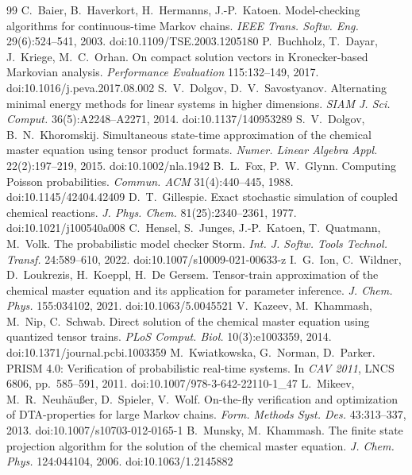 \documentclass[11pt]{article}
\begin{document}

\begin{thebibliography}{99}
 C.~Baier, B.~Haverkort, H.~Hermanns, J.-P.~Katoen. Model-checking algorithms for continuous-time Markov chains. \emph{IEEE Trans. Softw. Eng.} 29(6):524--541, 2003. doi:10.1109/TSE.2003.1205180
 P.~Buchholz, T.~Dayar, J.~Kriege, M.~C.~Orhan. On compact solution vectors in Kronecker-based Markovian analysis. \emph{Performance Evaluation} 115:132--149, 2017. doi:10.1016/j.peva.2017.08.002
 S.~V.~Dolgov, D.~V.~Savostyanov. Alternating minimal energy methods for linear systems in higher dimensions. \emph{SIAM J. Sci. Comput.} 36(5):A2248--A2271, 2014. doi:10.1137/140953289
 S.~V.~Dolgov, B.~N.~Khoromskij. Simultaneous state-time approximation of the chemical master equation using tensor product formats. \emph{Numer. Linear Algebra Appl.} 22(2):197--219, 2015. doi:10.1002/nla.1942
 B.~L.~Fox, P.~W.~Glynn. Computing Poisson probabilities. \emph{Commun. ACM} 31(4):440--445, 1988. doi:10.1145/42404.42409
 D.~T.~Gillespie. Exact stochastic simulation of coupled chemical reactions. \emph{J. Phys. Chem.} 81(25):2340--2361, 1977. doi:10.1021/j100540a008
 C.~Hensel, S.~Junges, J.-P.~Katoen, T.~Quatmann, M.~Volk. The probabilistic model checker Storm. \emph{Int. J. Softw. Tools Technol. Transf.} 24:589--610, 2022. doi:10.1007/s10009-021-00633-z
 I.~G.~Ion, C.~Wildner, D.~Loukrezis, H.~Koeppl, H.~De Gersem. Tensor-train approximation of the chemical master equation and its application for parameter inference. \emph{J. Chem. Phys.} 155:034102, 2021. doi:10.1063/5.0045521
 V.~Kazeev, M.~Khammash, M.~Nip, C.~Schwab. Direct solution of the chemical master equation using quantized tensor trains. \emph{PLoS Comput. Biol.} 10(3):e1003359, 2014. doi:10.1371/journal.pcbi.1003359
 M.~Kwiatkowska, G.~Norman, D.~Parker. PRISM 4.0: Verification of probabilistic real-time systems. In \emph{CAV 2011}, LNCS 6806, pp.~585--591, 2011. doi:10.1007/978-3-642-22110-1\_47
 L.~Mikeev, M.~R.~Neuh\"au{\ss}er, D.~Spieler, V.~Wolf. On-the-fly verification and optimization of DTA-properties for large Markov chains. \emph{Form. Methods Syst. Des.} 43:313--337, 2013. doi:10.1007/s10703-012-0165-1
 B.~Munsky, M.~Khammash. The finite state projection algorithm for the solution of the chemical master equation. \emph{J. Chem. Phys.} 124:044104, 2006. doi:10.1063/1.2145882

\end{thebibliography}
\end{document}
